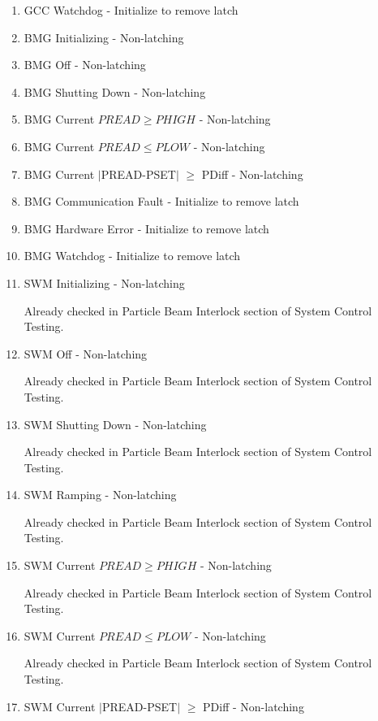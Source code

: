 \documentclass[11pt]{book}		%
\begin{document}
\begin{enumerate}
 \item GCC Watchdog - Initialize to remove latch
 \item BMG Initializing - Non-latching
 \item BMG Off - Non-latching
 \item BMG Shutting Down - Non-latching
 \item BMG Current $PREAD \geq PHIGH$ - Non-latching
 \item BMG Current $PREAD \leq PLOW$ - Non-latching
 \item BMG Current $\mid$PREAD-PSET$\mid$  $\geq$ PDiff - Non-latching
 \item BMG Communication Fault - Initialize to remove latch
 \item BMG Hardware Error - Initialize to remove latch
 \item BMG Watchdog - Initialize to remove latch
 \item SWM Initializing - Non-latching

\color{red}
Already checked in Particle Beam Interlock section of System Control Testing.
\color{black}

 \item SWM Off - Non-latching

\color{red}
Already checked in Particle Beam Interlock section of System Control Testing.
\color{black}

 \item SWM Shutting Down - Non-latching

\color{red}
Already checked in Particle Beam Interlock section of System Control Testing.
\color{black}

 \item SWM Ramping - Non-latching

\color{red}
Already checked in Particle Beam Interlock section of System Control Testing.
\color{black}

 \item SWM Current $PREAD \geq PHIGH$ - Non-latching

\color{red}
Already checked in Particle Beam Interlock section of System Control Testing.
\color{black}

 \item SWM Current $PREAD \leq PLOW$ - Non-latching

\color{red}
Already checked in Particle Beam Interlock section of System Control Testing.
\color{black}

 \item SWM Current $\mid$PREAD-PSET$\mid$  $\geq$ PDiff - Non-latching


\end{enumerate}
\end{document}
